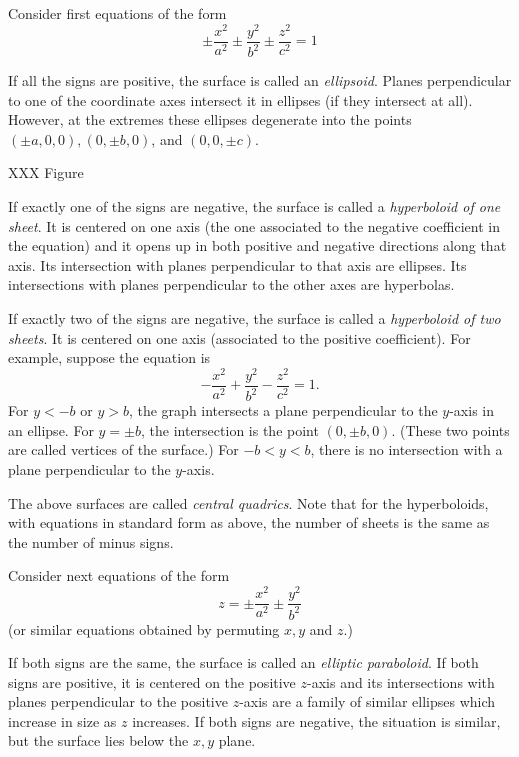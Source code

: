 Consider first equations of the form
\[
   \pm \frac{x^2}{a^2} 
   \pm \frac{y^2}{b^2} 
   \pm \frac{z^2}{c^2} = 1
\]

If all the signs are positive, the surface is called an {\it 
ellipsoid}.
Planes perpendicular to one of the coordinate axes intersect it
in ellipses (if they intersect at all).   However, at the extremes
these ellipses degenerate into the points $(\pm a, 0, 0),
(0,\pm b, 0)$, and $(0,0,\pm c)$.

XXX Figure

If exactly one of the signs are negative, the surface is called a
\emph{hyperboloid of one sheet}.   It is centered on one axis
(the one associated to the negative coefficient in the equation)
and it opens up in both positive and negative directions along
that axis.  Its intersection with planes perpendicular to that
axis are ellipses.   Its intersections with planes perpendicular to
the other axes are hyperbolas.


If exactly two of the signs are negative, the surface is called
a \emph{hyperboloid of two sheets}.   It is centered on one
axis (associated to the positive coefficient).  For example,
suppose the equation is
\[
  -\frac{x^2}{a^2}
  +\frac{y^2}{b^2}
  -\frac{z^2}{c^2} = 1.
\]
For $y < -b$ or $y > b$, the graph intersects a plane perpendicular
to the $y$-axis in an ellipse.  For $y = \pm b$, the intersection
is the point $(0,\pm b, 0)$.  (These two points are called vertices
of the surface.)  For $-b < y < b$, there is no intersection with
a plane perpendicular to the $y$-axis.


The above surfaces are called \emph{central quadrics}.
Note that for the hyperboloids, with equations in standard form as
above, the number of sheets is the same as
the number of minus signs.

Consider next equations of the form
\[
   z = \pm \frac{x^2}{a^2} \pm \frac{y^2}{b^2}
\]
(or similar equations obtained by permuting $x, y$ and $z$.)

If both signs are the same, the surface is called an {\it elliptic
paraboloid}.   If both signs are positive, it is centered on the
positive $z$-axis and its intersections with planes perpendicular to
the positive $z$-axis are a family of similar ellipses which increase
in size as $z$ increases.   If both signs are negative, the situation
is similar, but the surface lies below the $x,y$ plane.



